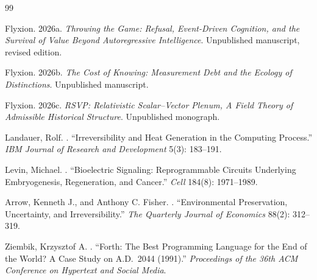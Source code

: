\documentclass[11pt]{article}
\theoremstyle{plain}
\begin{document}
{\renewcommand{\refname}{}
\begin{thebibliography}{99}

Flyxion.
\newblock 2026a.
\newblock \emph{Throwing the Game: Refusal, Event-Driven Cognition, and the Survival of Value Beyond Autoregressive Intelligence}.
\newblock Unpublished manuscript, revised edition.

Flyxion.
\newblock 2026b.
\newblock \emph{The Cost of Knowing: Measurement Debt and the Ecology of Distinctions}.
\newblock Unpublished manuscript.

Flyxion.
\newblock 2026c.
\newblock \emph{RSVP: Relativistic Scalar--Vector Plenum, A Field Theory of Admissible Historical Structure}.
\newblock Unpublished monograph.

Landauer, Rolf.
.
\newblock ``Irreversibility and Heat Generation in the Computing Process.''
\newblock \emph{IBM Journal of Research and Development} 5(3): 183--191.

Levin, Michael.
.
\newblock ``Bioelectric Signaling: Reprogrammable Circuits Underlying Embryogenesis, Regeneration, and Cancer.''
\newblock \emph{Cell} 184(8): 1971--1989.

Arrow, Kenneth J., and Anthony C. Fisher.
.
\newblock ``Environmental Preservation, Uncertainty, and Irreversibility.''
\newblock \emph{The Quarterly Journal of Economics} 88(2): 312--319.

Ziembik, Krzysztof A.
.
\newblock ``Forth: The Best Programming Language for the End of the World? A Case Study on A.D.\ 2044 (1991).''
\newblock \emph{Proceedings of the 36th ACM Conference on Hypertext and Social Media}.

\end{thebibliography}
}
\end{document}
